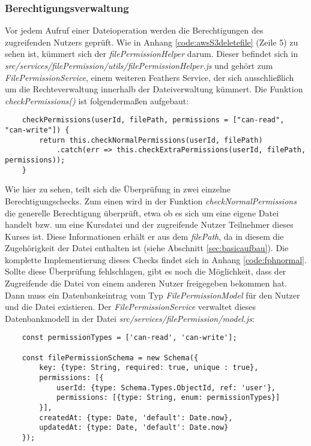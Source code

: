 \subsubsection{Berechtigungsverwaltung}
\label{sec:permissionsimpl}

Vor jedem Aufruf einer Dateioperation werden die Berechtigungen des zugreifenden Nutzers geprüft. Wie in Anhang \ref{code:awsS3deletefile} (Zeile 5) zu sehen ist, kümmert sich der \textit{filePermissionHelper} darum. Dieser befindet sich in \textit{src/services/filePermission/utils/filePermissionHelper.js} und gehört zum \textit{FilePermissionService}, einem weiteren Feathers Service, der sich ausschließlich um die Rechteverwaltung innerhalb der Dateiverwaltung kümmert. Die Funktion \textit{checkPermissions()} ist folgendermaßen aufgebaut:

\begin{lstlisting}
	checkPermissions(userId, filePath, permissions = ["can-read", "can-write"]) {
		return this.checkNormalPermissions(userId, filePath)
			.catch(err => this.checkExtraPermissions(userId, filePath, permissions));
	}
\end{lstlisting}

Wie hier zu sehen, teilt sich die Überprüfung in zwei einzelne Berechtigungschecks. Zum einen wird in der Funktion \textit{checkNormalPermissions} die generelle Berechtigung überprüft, etwa ob es sich um eine eigene Datei handelt bzw. um eine Kursdatei und der zugreifende Nutzer Teilnehmer dieses Kurses ist. Diese Informationen erhält er aus dem \textit{filePath}, da in diesem die Zugehörigkeit der Datei enthalten ist (siehe Abschnitt \ref{sec:basicaufbau}). Die komplette Implementierung dieses Checks findet sich in Anhang \ref{code:fphnormal}. Sollte diese Überprüfung fehlschlagen, gibt es noch die Möglichkeit, dass der Zugreifende die Datei von einem anderen Nutzer freigegeben bekommen hat. Dann muss ein Datenbankeintrag vom Typ \textit{FilePermissionModel} für den Nutzer und die Datei existieren. Der \textit{FilePermissionService} verwaltet dieses Datenbankmodell in der Datei \textit{src/services/filePermission/model.js}:

\begin{lstlisting}
	const permissionTypes = ['can-read', 'can-write'];
	
	const filePermissionSchema = new Schema({
		key: {type: String, required: true, unique : true},
		permissions: [{
			userId: {type: Schema.Types.ObjectId, ref: 'user'},
			permissions: [{type: String, enum: permissionTypes}]
		}],
		createdAt: {type: Date, 'default': Date.now},
		updatedAt: {type: Date, 'default': Date.now}
	});
\end{lstlisting}

